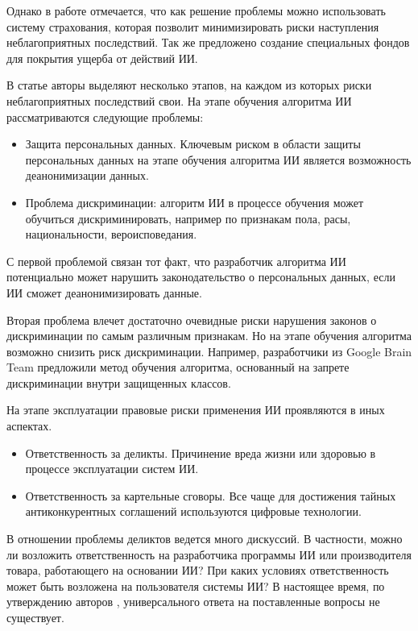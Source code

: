 Однако в работе \cite{reg} отмечается, что как решение проблемы можно использовать систему страхования,
которая позволит минимизировать риски наступления неблагоприятных последствий. Так же предложено
создание специальных фондов для покрытия ущерба от действий ИИ.

В статье \cite{self} авторы выделяют несколько этапов, на каждом из которых риски
неблагоприятных последствий свои.
На этапе обучения алгоритма ИИ рассматриваются следующие проблемы:

\begin{itemize}
\item Защита персональных данных. Ключевым риском в области защиты персональных данных на этапе обучения
алгоритма ИИ является возможность деанонимизации данных.
\item Проблема дискриминации: алгоритм ИИ в процессе обучения может обучиться дискриминировать, например
по признакам пола, расы, национальности, вероисповедания.
\end{itemize}

С первой проблемой связан тот факт, что разработчик алгоритма ИИ потенциально может нарушить законодательство
о персональных данных, если ИИ сможет деанонимизировать данные.

Вторая проблема влечет достаточно очевидные риски нарушения законов о дискриминации по самым различным признакам.
Но на этапе обучения алгоритма возможно снизить риск
дискриминации. Например, разработчики из Google Brain Team предложили метод обучения алгоритма,
основанный на запрете дискриминации внутри защищенных классов.

На этапе эксплуатации правовые риски применения ИИ проявляются в иных аспектах.

\begin{itemize}
\item Ответственность за деликты. Причинение вреда жизни или здоровью в процессе эксплуатации систем ИИ.
\item Ответственность за картельные сговоры. Все чаще для достижения тайных антиконкурентных соглашений
используются цифровые технологии.
\end{itemize}

В отношении проблемы деликтов ведется много дискуссий. В частности, можно ли возложить ответственность на
разработчика программы ИИ или производителя товара, работающего на основании ИИ? При каких условиях
ответственность может быть возложена на пользователя системы ИИ? В настоящее время, по
утверждению авторов \cite{self}, универсального ответа на поставленные вопросы не существует.

